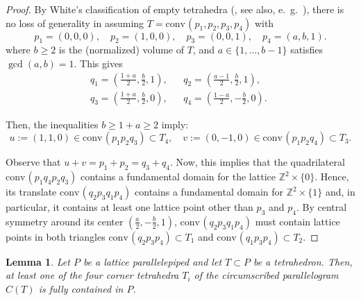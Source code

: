 \documentclass{amsart}
\theoremstyle{plain}
\newtheorem{lemma}[theorem]{Lemma}
\theoremstyle{definition}
\newcommand{\Z}{ \ensuremath{\mathbb{Z}}}
\newcommand{\conv}{\ensuremath{\mathrm{conv}}\hspace{1pt}}
\begin{document}
\begin{proof}
By White's classification of empty tetrahedra (\cite{White1964}, see also, e.~g.~\cite[Sect.~4.1]{HPPS-survey}), there is no loss of generality in assuming $T=\conv(p_1,p_2,p_3,p_4)$ with
\[
p_1=(0,0,0), \quad
p_2=(1,0,0), \quad
p_3=(0,0,1), \quad
p_4=(a,b,1).
\]
where $b\ge 2$ is the (normalized) volume of $T$, and $a\in \{1,\dots,b-1\}$ satisfies $\gcd(a,b)=1$. This gives 
\begin{align*}
q_1=\left(\frac{1+a}2,\frac{b}2,1\right), &&
q_2=\left(\frac{a-1}2,\frac{b}2,1\right), \quad\\
q_3=\left(\frac{1+a}2,\frac{b}2,0\right), &&
q_4=\left(\frac{1-a}2,-\frac{b}2,0\right).
\end{align*}

Then, the inequalities $b\ge 1+a \ge 2$ imply:
\[
u:=(1,1,0)\in \conv(p_1p_2q_3) \subset T_4, \quad
v:=(0,-1,0)\in \conv(p_1p_2q_4) \subset T_3.
\]

Observe that $u+v=p_1+p_2=q_3+q_4$.
Now, this implies that the quadrilateral $\conv(p_1q_4p_2q_3)$ contains a fundamental domain for the lattice $\Z^2\times\{0\}$. Hence, its translate $\conv(q_2p_3q_1p_4)$ contains a fundamental domain for $\Z^2\times\{1\}$ and, in particular, it contains at least one lattice point other than $p_3$ and $p_4$. By central symmetry around its center $\left(\frac{a}2,-\frac{b}2,1\right)$, $\conv(q_2p_3q_1p_4)$ must contain lattice points in both triangles $\conv(q_2p_3p_4)\subset T_1$ and $\conv(q_1p_3p_4)\subset T_2$.
%


\end{proof}


\begin{lemma}
\label{lemma:3<4}
Let $P$ be a lattice parallelepiped and let $T\subset P$ be a tetrahedron. Then, at least one of the four corner tetrahedra $T_i$ of the circumscribed parallelogram $C(T)$ is fully contained in $P$.
\end{lemma}
\end{document}
